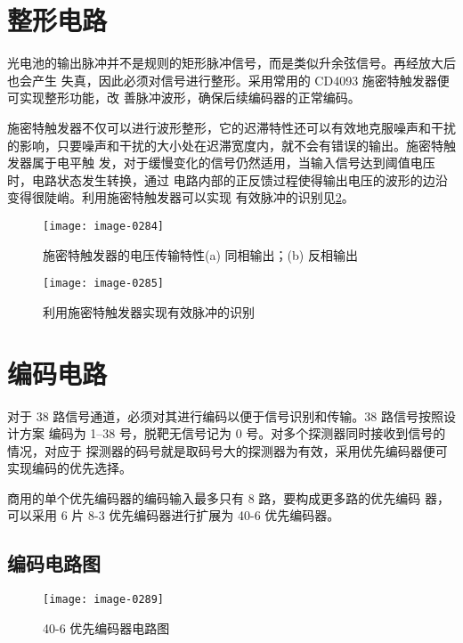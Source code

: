 \clearpage
\vspace*{-1.5em}
\section{整形电路\cite{cn11}}

光电池的输出脉冲并不是规则的矩形脉冲信号，而是类似升余弦信号。再经放大后也会产生
失真，因此必须对信号进行整形。采用常用的 CD4093 施密特触发器便可实现整形功能，改
善脉冲波形，确保后续编码器的正常编码。

施密特触发器不仅可以进行波形整形，它的迟滞特性还可以有效地克服噪声和干扰的影响，只要噪声和干扰的大小处在迟滞宽度内，就不会有错误的输出。施密特触发器属于电平触
发，对于缓慢变化的信号仍然适用，当输入信号达到阈值电压时，电路状态发生转换，通过
电路内部的正反馈过程使得输出电压的波形的边沿变得很陡峭。利用施密特触发器可以实现
有效脉冲的识别见\cref{4-5}。

\begin{figure}[htbp]
  \centering
  \texttt{[image: image-0284]}
  \caption{施密特触发器的电压传输特性\quad (a) 同相输出；(b) 反相输出}
  \label{4-4}
\end{figure}

\begin{figure}[htbp]
  \centering
  \texttt{[image: image-0285]}
  \caption{利用施密特触发器实现有效脉冲的识别}
  \label{4-5}
\end{figure}

\section{编码电路\cite{cn11}}

对于 38 路信号通道，必须对其进行编码以便于信号识别和传输。38 路信号按照设计方案
编码为 1--38 号，脱靶无信号记为 0 号。对多个探测器同时接收到信号的情况，对应于
探测器的码号就是取码号大的探测器为有效，采用优先编码器便可实现编码的优先选择。

商用的单个优先编码器的编码输入最多只有 8 路，要构成更多路的优先编码
器，可以采用 6 片 8-3 优先编码器进行扩展为 40-6 优先编码器。

\subsection{编码电路图}

\begin{figure}[htbp]
  \centering
  \texttt{[image: image-0289]}
  \caption{40-6 优先编码器电路图}
  \label{4-6}
\end{figure}


